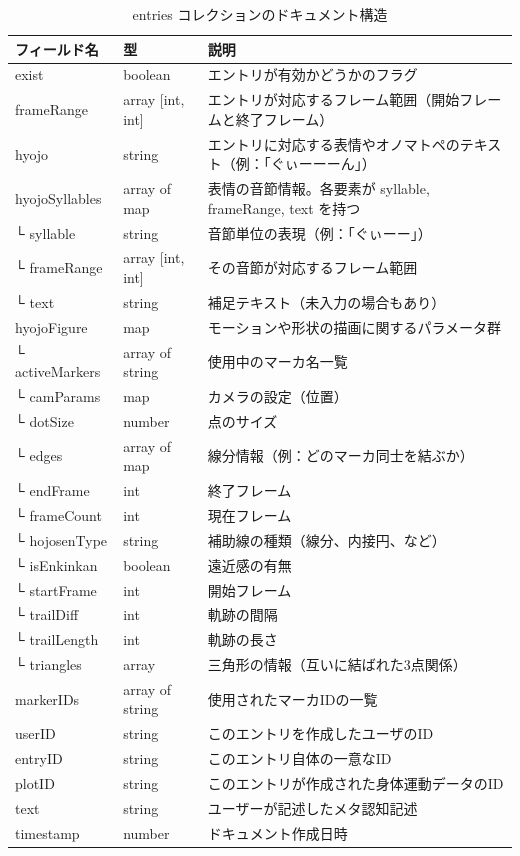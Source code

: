 \begin{table}[H]
  \centering
  \caption{entries コレクションのドキュメント構造}  
  \label{table:entries}
  \begin{tabular}{|l|l|p{8cm}|}
    \hline
    \bf フィールド名 & \bf 型 & \bf 説明 \\
    \hline
    exist & boolean & エントリが有効かどうかのフラグ \\
    frameRange & array [int, int] & エントリが対応するフレーム範囲（開始フレームと終了フレーム） \\
    hyojo & string & エントリに対応する表情やオノマトペのテキスト（例：「ぐぃーーーん」） \\
    hyojoSyllables & array of map & 表情の音節情報。各要素が syllable, frameRange, text を持つ \\
    \quad └ syllable & string & 音節単位の表現（例：「ぐぃーー」） \\
    \quad └ frameRange & array [int, int] & その音節が対応するフレーム範囲 \\
    \quad └ text & string & 補足テキスト（未入力の場合もあり） \\
    hyojoFigure & map & モーションや形状の描画に関するパラメータ群 \\
    \quad └ activeMarkers & array of string & 使用中のマーカ名一覧 \\
    \quad └ camParams & map & カメラの設定（位置） \\
    \quad └ dotSize & number & 点のサイズ \\
    \quad └ edges & array of map & 線分情報（例：どのマーカ同士を結ぶか） \\
    \quad └ endFrame & int & 終了フレーム \\
    \quad └ frameCount & int & 現在フレーム \\
    \quad └ hojosenType & string & 補助線の種類（線分、内接円、など） \\
    \quad └ isEnkinkan & boolean & 遠近感の有無 \\    
    \quad └ startFrame & int & 開始フレーム \\
    \quad └ trailDiff & int & 軌跡の間隔 \\
    \quad └ trailLength & int & 軌跡の長さ \\
    \quad └ triangles & array & 三角形の情報（互いに結ばれた3点関係） \\    
    markerIDs & array of string & 使用されたマーカIDの一覧 \\
    userID & string & このエントリを作成したユーザのID \\
    entryID & string & このエントリ自体の一意なID \\
    plotID & string & このエントリが作成された身体運動データのID \\
    text & string & ユーザーが記述したメタ認知記述 \\
    timestamp & number & ドキュメント作成日時 \\
    \hline
  \end{tabular}
\end{table}
